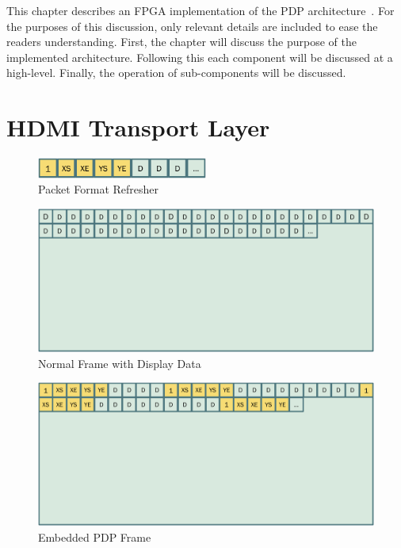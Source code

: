 \label{chap:implementation}
This chapter describes an FPGA implementation of the PDP architecture~\cite{LandwehrEtAl2019_2,JacksonEtAl2019,BrowningEtAl2020}. For the purposes of this discussion, only relevant details are included to ease the readers understanding. First, the chapter will discuss the purpose of the implemented architecture. Following this each component will be discussed at a high-level. Finally, the operation of sub-components will be discussed.
\section{HDMI Transport Layer}
    \label{sec:hdmi_transport_layer}
    \begin{figure}
        \centering
        \includegraphics[width=0.5\textwidth]{fig/packet_refresher.pdf}
        \caption{Packet Format Refresher}
        \label{fig:packet_refresher}
    \end{figure}
    \begin{figure}
        \centering
        \includegraphics[width=1.0\textwidth]{fig/classic_video.pdf}
        \caption{Normal Frame with Display Data}
        \label{fig:classic_video}
    \end{figure}
    \begin{figure}
        \centering
        \includegraphics[width=1.0\textwidth]{fig/embedded_frame.pdf}
        \caption{Embedded PDP Frame}
        \label{fig:embedded_frame}
    \end{figure}
